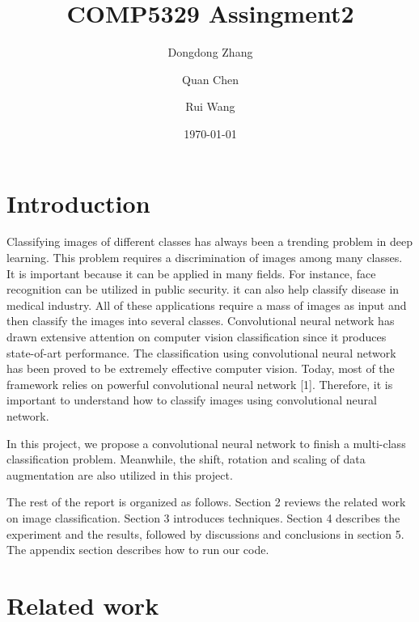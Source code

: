 \documentclass[twoside,twocolumn,10.8pt]{article}
\title{COMP5329 Assingment2} %
\author[1]{Dongdong Zhang}
\author[2]{Quan Chen}
\author[3]{Rui Wang}
\affil[1,2,3]{University of Sydney}
{	
    \makeatletter
    \renewcommand\AB@affilsepx{: \protect\Affilfont}
    \makeatother

    \affil[ ]{Student ID}

    \makeatletter
    \renewcommand\AB@affilsepx{, \protect\Affilfont}
    \makeatother

    \affil[1]{470161133}
    \affil[2]{470199228}
    \affil[3]{470208162}
}
\date{\today} %
\begin{document}
\maketitle


\section{Introduction}

\lettrine[nindent=0em,lines=3]{C}{}lassifying images of different classes has always been a trending problem in deep learning. This problem requires a discrimination of images among many classes. It is important because it can be applied in many fields. For instance, face recognition can be utilized in public security. it can also help classify disease in medical industry. All of these applications require a mass of images as input and then classify the images into several classes. Convolutional neural network has drawn extensive attention on computer vision classification since it produces state-of-art performance. The classification using convolutional neural network has been proved to be extremely effective computer vision. Today, most of the framework relies on powerful convolutional neural network [1]. Therefore, it is important to understand how to classify images using convolutional neural network. 


\noindent In this project, we propose a convolutional neural network to finish a multi-class classification problem. Meanwhile, the shift, rotation and scaling of data augmentation are also utilized in this project.

\noindent The rest of the report is organized as follows. Section 2 reviews the related work on image classification. Section 3 introduces techniques. Section 4 describes the experiment and the results, followed by discussions and conclusions in section 5. The appendix section describes how to run our code. 


\section{Related work}
\end{document}
